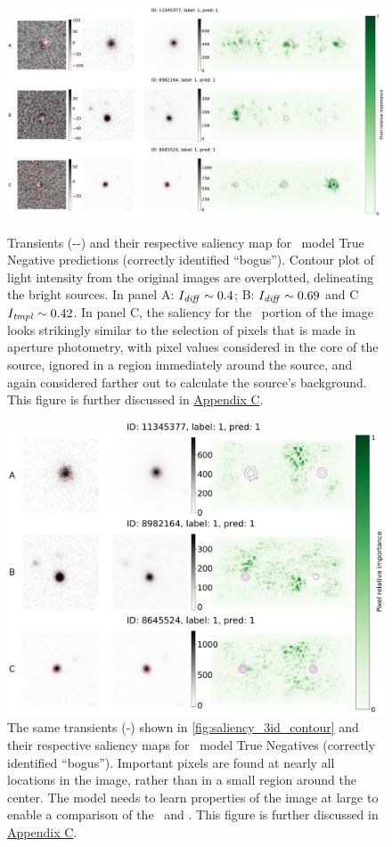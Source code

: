 \begin{figure}
    \centering
    \includegraphics[width=0.85\linewidth]{
    figures/saliency_plot_3exam_contou_cheating.pdf}
    \caption{Transients (\diff-\search-\temp) and their respective saliency map for \diabased\ model True Negative predictions (correctly identified ``bogus'').  Contour plot of light intensity from the original images are overplotted, delineating the bright sources. In panel A: $I_{\it diff} \sim 0.4$; B: $I_{\it diff}\sim0.69$ and C $I_{\it tmpl}\sim0.42$. In panel C, the saliency for the \temp\ portion of the image looks strikingly similar to the selection of pixels that is made in aperture photometry, with pixel values considered in the core of the source, ignored in a region immediately around the source, and again considered farther out to calculate the source's background. This figure is further discussed in \hyperref[sec:appendixc]{Appendix C}.}
    \label{fig:saliency_3id_contour}

    \includegraphics[width=0.65\linewidth]{
    figures/saliency_plot_noDIA3exam.pdf}
    \caption{The same transients (\search-\temp) shown in \autoref{fig:saliency_3id_contour} and their respective saliency maps for \nodia\ model True Negatives (correctly identified ``bogus'').  Important pixels are found at nearly all locations in the image, rather than in a small region around the center. The model needs to learn properties of the image at large to enable a comparison of the \temp\ and \diff.  This figure is further discussed in \hyperref[sec:appendixc]{Appendix C}.}
    \label{fig:saliency_nodia3id_contour}
\end{figure}


